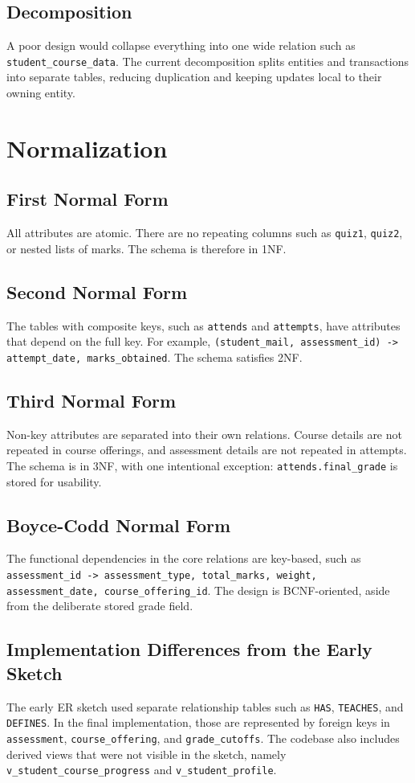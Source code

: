 \documentclass[12pt,a4paper]{report}
\begin{document}
\subsection{Decomposition}
A poor design would collapse everything into one wide relation such as \texttt{student\_course\_data}. The current decomposition splits entities and transactions into separate tables, reducing duplication and keeping updates local to their owning entity.

\section{Normalization}
\subsection{First Normal Form}
All attributes are atomic. There are no repeating columns such as \texttt{quiz1}, \texttt{quiz2}, or nested lists of marks. The schema is therefore in 1NF.

\subsection{Second Normal Form}
The tables with composite keys, such as \texttt{attends} and \texttt{attempts}, have attributes that depend on the full key. For example, \texttt{(student\_mail, assessment\_id) -> attempt\_date, marks\_obtained}. The schema satisfies 2NF.

\subsection{Third Normal Form}
Non-key attributes are separated into their own relations. Course details are not repeated in course offerings, and assessment details are not repeated in attempts. The schema is in 3NF, with one intentional exception: \texttt{attends.final\_grade} is stored for usability.

\subsection{Boyce-Codd Normal Form}
The functional dependencies in the core relations are key-based, such as \texttt{assessment\_id -> assessment\_type, total\_marks, weight, assessment\_date, course\_offering\_id}. The design is BCNF-oriented, aside from the deliberate stored grade field.

\subsection{Implementation Differences from the Early Sketch}
The early ER sketch used separate relationship tables such as \texttt{HAS}, \texttt{TEACHES}, and \texttt{DEFINES}. In the final implementation, those are represented by foreign keys in \texttt{assessment}, \texttt{course\_offering}, and \texttt{grade\_cutoffs}. The codebase also includes derived views that were not visible in the sketch, namely \texttt{v\_student\_course\_progress} and \texttt{v\_student\_profile}.
\end{document}

